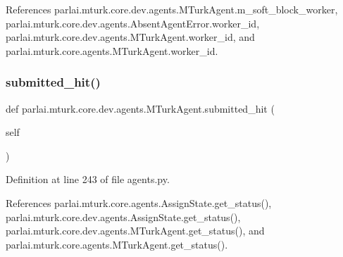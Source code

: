 References parlai.\+mturk.\+core.\+dev.\+agents.\+M\+Turk\+Agent.\+m\+\_\+soft\+\_\+block\+\_\+worker, parlai.\+mturk.\+core.\+dev.\+agents.\+Absent\+Agent\+Error.\+worker\+\_\+id, parlai.\+mturk.\+core.\+dev.\+agents.\+M\+Turk\+Agent.\+worker\+\_\+id, and parlai.\+mturk.\+core.\+agents.\+M\+Turk\+Agent.\+worker\+\_\+id.

\mbox{\label{classparlai_1_1mturk_1_1core_1_1dev_1_1agents_1_1MTurkAgent_a6662232ebdd301d2547c2433cd0386f3}} 
\subsubsection{\texorpdfstring{submitted\+\_\+hit()}{submitted\_hit()}}
{\footnotesize\ttfamily def parlai.\+mturk.\+core.\+dev.\+agents.\+M\+Turk\+Agent.\+submitted\+\_\+hit (\begin{DoxyParamCaption}\item[{}]{self }\end{DoxyParamCaption})}



Definition at line 243 of file agents.\+py.



References parlai.\+mturk.\+core.\+agents.\+Assign\+State.\+get\+\_\+status(), parlai.\+mturk.\+core.\+dev.\+agents.\+Assign\+State.\+get\+\_\+status(), parlai.\+mturk.\+core.\+dev.\+agents.\+M\+Turk\+Agent.\+get\+\_\+status(), and parlai.\+mturk.\+core.\+agents.\+M\+Turk\+Agent.\+get\+\_\+status().

